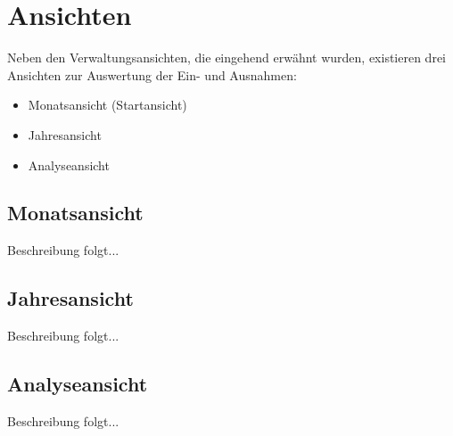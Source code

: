\chapter{Ansichten} \label{chap:import}

Neben den Verwaltungsansichten, die eingehend erwähnt wurden, existieren drei Ansichten zur Auswertung der Ein- und Ausnahmen:

\begin{itemize}[nosep]
	\item Monatsansicht (Startansicht)
	\item Jahresansicht
	\item Analyseansicht
\end{itemize}

\section{Monatsansicht}

Beschreibung folgt...

\section{Jahresansicht}

Beschreibung folgt...

\section{Analyseansicht}

Beschreibung folgt...
